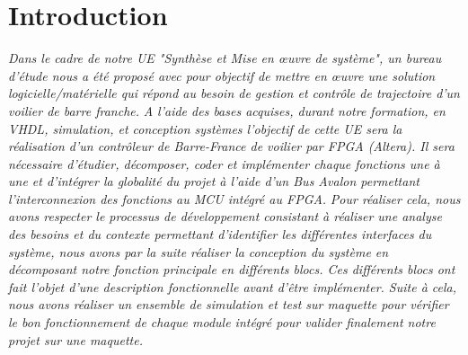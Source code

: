 \section*{Introduction}
\label{Introduction}
\textit{Dans le cadre de notre UE "Synthèse et Mise en œuvre de système", un bureau d'étude nous a été proposé avec pour objectif de mettre en œuvre une solution logicielle/matérielle qui répond au besoin de gestion et contrôle de trajectoire d'un voilier de barre franche.}\vspace{0.5cm}
\textit{\newline A l'aide des bases acquises, durant notre formation, en VHDL, simulation, et conception systèmes l'objectif de cette UE sera la réalisation d'un contrôleur de Barre-France de voilier par FPGA (Altera). Il sera nécessaire d'étudier, décomposer, coder et implémenter chaque fonctions une à une et d'intégrer la globalité du projet à l'aide d'un Bus Avalon permettant l'interconnexion des fonctions au MCU intégré au FPGA.}\vspace{0.5cm}
\textit{\newline Pour réaliser cela, nous avons respecter le processus de développement consistant à réaliser une analyse  des besoins et du contexte permettant d'identifier les différentes interfaces du système, nous avons par la suite réaliser la conception du système en décomposant notre fonction principale en différents blocs. Ces différents blocs ont fait l'objet d'une description fonctionnelle avant d'être implémenter. Suite à cela, nous avons réaliser un ensemble de simulation et test sur maquette pour vérifier le bon fonctionnement de chaque module intégré pour valider finalement notre projet sur une maquette.}